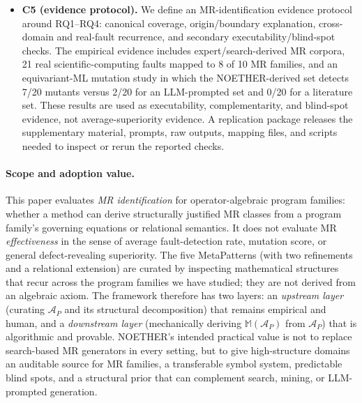 \documentclass[manuscript]{acmart}
\begin{document}
\begin{itemize}
  \item \textbf{C5 (evidence protocol).} We define an MR-identification evidence protocol around RQ1--RQ4: canonical coverage, origin/boundary explanation, cross-domain and real-fault recurrence, and secondary executability/blind-spot checks. The empirical evidence includes expert/search-derived MR corpora, 21 real scientific-computing faults mapped to 8 of 10 MR families, and an equivariant-ML mutation study in which the NOETHER-derived set detects 7/20 mutants versus 2/20 for an LLM-prompted set and 0/20 for a literature set. These results are used as executability, complementarity, and blind-spot evidence, not average-superiority evidence. A replication package releases the supplementary material, prompts, raw outputs, mapping files, and scripts needed to inspect or rerun the reported checks.
\end{itemize}

\paragraph{Scope and adoption value.} This paper evaluates \emph{MR identification} for operator-algebraic program families: whether a method can derive structurally justified MR classes from a program family's governing equations or relational semantics. It does not evaluate MR \emph{effectiveness} in the sense of average fault-detection rate, mutation score, or general defect-revealing superiority. The five MetaPatterns (with two refinements and a relational extension) are curated by inspecting mathematical structures that recur across the program families we have studied; they are not derived from an algebraic axiom. The framework therefore has two layers: an \emph{upstream layer} (curating $\mathcal{A}_P$ and its structural decomposition) that remains empirical and human, and a \emph{downstream layer} (mechanically deriving $\mathbb{M}(\mathcal{A}_P)$ from $\mathcal{A}_P$) that is algorithmic and provable. NOETHER's intended practical value is not to replace search-based MR generators in every setting, but to give high-structure domains an auditable source for MR families, a transferable symbol system, predictable blind spots, and a structural prior that can complement search, mining, or LLM-prompted generation.
\end{document}
